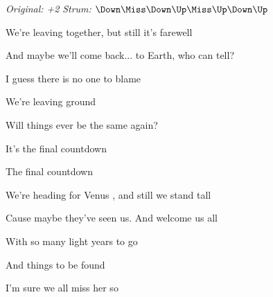 \begin{song}


\begin{headerbox}
\textit{Original: +2} \quad
\textit{Strum:} $\Down\Miss\Down\Up\Miss\Up\Down\Up$
\end{headerbox}

\begin{hchordbox}
\end{hchordbox}

\Large

\bigskip

\Intro \par
{}    \par
{}    \par
{}     \par

\bigskip

 We’re leaving together, but still it’s farewell \par
{} And maybe we’ll come back...  to Earth, who can tell? \par
{} I guess there is no one to blame \par
{} We’re leaving ground  \par
{} Will things ever be the same again? \par

\bigskip

It’s the final countdown    \par
The final countdown    \par

\bigskip

 We’re heading for Venus , and still we stand tall \par
{} Cause maybe they’ve seen us.  And welcome us all  \par
{} With so many light years to go \par
{} And things to be found  \par
{} I’m sure we all miss her so \par


\end{song}
